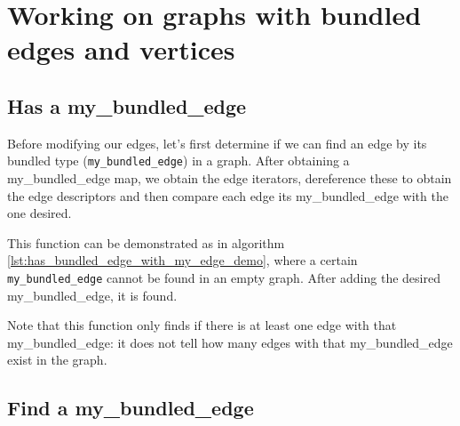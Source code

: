 \chapter{Working on graphs with bundled edges and vertices}

\section{Has a my\_bundled\_edge}
\label{subsec:has_bundled_edge_with_my_edge}

Before modifying our edges, let's first determine if we can find an edge
by its bundled type (\verb;my_bundled_edge;) in a graph.
After obtaining a my\_bundled\_edge map, 
we obtain the edge iterators, dereference these to obtain 
the edge descriptors and then compare each edge its my\_bundled\_edge 
with the one desired.



This function can be demonstrated as in algorithm 
\ref{lst:has_bundled_edge_with_my_edge_demo}, 
where a certain \verb;my_bundled_edge; cannot be found in an empty graph.
After adding the desired my\_bundled\_edge, it is found.



Note that this function only finds if there is at least one edge with that
my\_bundled\_edge: it does not tell how many edges with that my_bundled_edge
exist in the graph.

\section{Find a my\_bundled\_edge}
\label{subsec:find_first_bundled_edge_with_my_edge}

